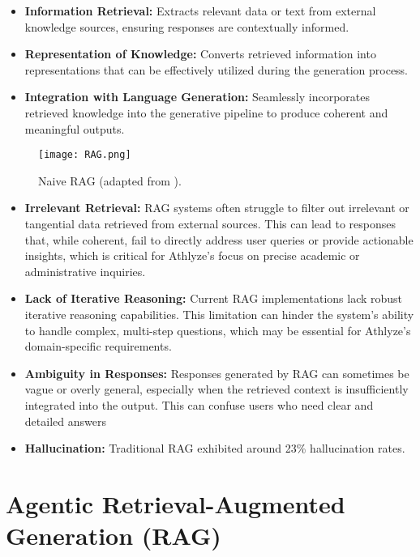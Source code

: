 \documentclass[conference]{IEEEtran}
\begin{document}
\begin{itemize}
\item \textbf{Information Retrieval:} Extracts relevant data or text from external knowledge sources, ensuring responses are contextually informed.
\item \textbf{Representation of Knowledge:} Converts retrieved information into representations that can be effectively utilized during the generation process.
\item \textbf{Integration with Language Generation:} Seamlessly incorporates retrieved knowledge into the generative pipeline to produce coherent and meaningful outputs.\\
\end{itemize}

\begin{figure}[h!]
    \centering
    \texttt{[image: RAG.png]}
    \caption{Naive RAG (adapted from \cite{16}).}
    \label{fig:RAG}
\end{figure}


\begin{itemize}
\item \textbf{Irrelevant Retrieval:} RAG systems often struggle to filter out irrelevant or tangential data retrieved from external sources. This can lead to responses that, while coherent, fail to directly address user queries or provide actionable insights, which is critical for Athlyze's focus on precise academic or administrative inquiries.
\item \textbf{Lack of Iterative Reasoning:} Current RAG implementations lack robust iterative reasoning capabilities. This limitation can hinder the system's ability to handle complex, multi-step questions, which may be essential for Athlyze's domain-specific requirements.
\item \textbf{Ambiguity in Responses:} Responses generated by RAG can sometimes be vague or overly general, especially when the retrieved context is insufficiently integrated into the output. This can confuse users who need clear and detailed answers
\item \textbf{Hallucination:} Traditional RAG exhibited around 23\% hallucination rates.\\

\end{itemize}

\section{Agentic Retrieval-Augmented Generation (RAG)}
\end{document}
